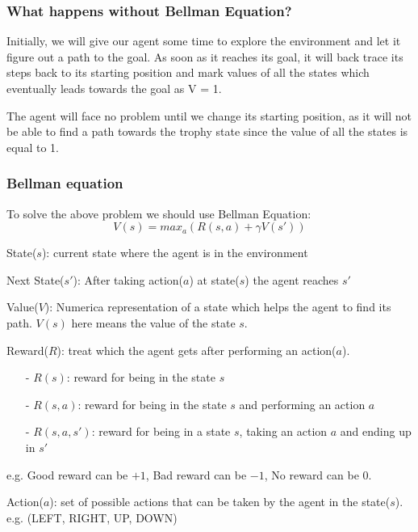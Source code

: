 \subsubsection{What happens without Bellman Equation?}

Initially, we will give our agent some time to explore the environment and let it 
figure out a path to the goal. As soon as it reaches its goal, it will back trace 
its steps back to its starting position and mark values of all the states which 
eventually leads towards the goal as V = 1.

The agent will face no problem until we change its starting position, as it will 
not be able to find a path towards the trophy state since the value of all the 
states is equal to 1. 

\subsubsection{Bellman equation}

To solve the above problem we should use Bellman Equation:
$$
V(s) = max_a\left( R(s,a) + \gamma V(s') \right)
$$

State($s$): current state where the agent is in the environment

Next State($s'$): After taking action($a$) at state($s$) the agent reaches $s'$

Value($V$): Numerica representation of a state which helps the agent to find its
path. $V(s)$ here means the value of the state $s$.

Reward($R$): treat which the agent gets after performing an action($a$).

\begin{itemize}
\setlength{\parskip}{0pt}
\item[-]
$R(s)$: reward for being in the state $s$

\item[-]
$R(s,a)$: reward for being in the state $s$ and performing an action $a$

\item[-]
$R(s,a,s')$: reward for being in a state $s$, taking an action $a$ and 
ending up in $s'$
\end{itemize}

e.g. Good reward can be $+1$, Bad reward can be $-1$, No reward can be $0$.

Action($a$): set of possible actions that can be taken by the agent in the 
state($s$). e.g. (LEFT, RIGHT, UP, DOWN)

